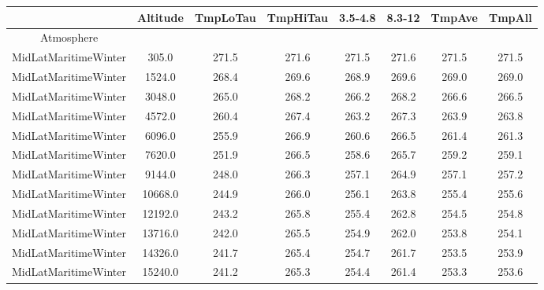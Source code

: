 \documentclass{workpackage}
\begin{document}
\begin{center}

\begin{normalsize}

\begin{tabular}{|c|c|c|c|c|c|c|c|}
\hline
&Altitude&TmpLoTau&TmpHiTau&3.5-4.8&8.3-12&TmpAve&TmpAll\\\hline
Atmosphere&&&&&&&\\\hline
MidLatMaritimeWinter&305.0&271.5&271.6&271.5&271.6&271.5&271.5\\\hline
MidLatMaritimeWinter&1524.0&268.4&269.6&268.9&269.6&269.0&269.0\\\hline
MidLatMaritimeWinter&3048.0&265.0&268.2&266.2&268.2&266.6&266.5\\\hline
MidLatMaritimeWinter&4572.0&260.4&267.4&263.2&267.3&263.9&263.8\\\hline
MidLatMaritimeWinter&6096.0&255.9&266.9&260.6&266.5&261.4&261.3\\\hline
MidLatMaritimeWinter&7620.0&251.9&266.5&258.6&265.7&259.2&259.1\\\hline
MidLatMaritimeWinter&9144.0&248.0&266.3&257.1&264.9&257.1&257.2\\\hline
MidLatMaritimeWinter&10668.0&244.9&266.0&256.1&263.8&255.4&255.6\\\hline
MidLatMaritimeWinter&12192.0&243.2&265.8&255.4&262.8&254.5&254.8\\\hline
MidLatMaritimeWinter&13716.0&242.0&265.5&254.9&262.0&253.8&254.1\\\hline
MidLatMaritimeWinter&14326.0&241.7&265.4&254.7&261.7&253.5&253.9\\\hline
MidLatMaritimeWinter&15240.0&241.2&265.3&254.4&261.4&253.3&253.6\\\hline

\end{tabular}
\end{normalsize}
\end{center}
\end{document}
